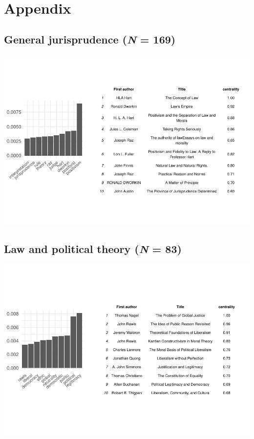 \documentclass[
]{article}
\begin{document}
\hypertarget{appendix}{%
\section{Appendix}\label{appendix}}

\hypertarget{general-jurisprudence-n-169}{%
\subsection{\texorpdfstring{General jurisprudence (\emph{N} = 169)}{General jurisprudence (N = 169)}}\label{general-jurisprudence-n-169}}

\begin{flushright}\includegraphics{paper_files/figure-latex/GJ-1} \end{flushright}

\hypertarget{law-and-political-theory-n-83}{%
\subsection{\texorpdfstring{Law and political theory (\emph{N} = 83)}{Law and political theory (N = 83)}}\label{law-and-political-theory-n-83}}

\begin{flushright}\includegraphics{paper_files/figure-latex/LPT-1} \end{flushright}
\end{document}
